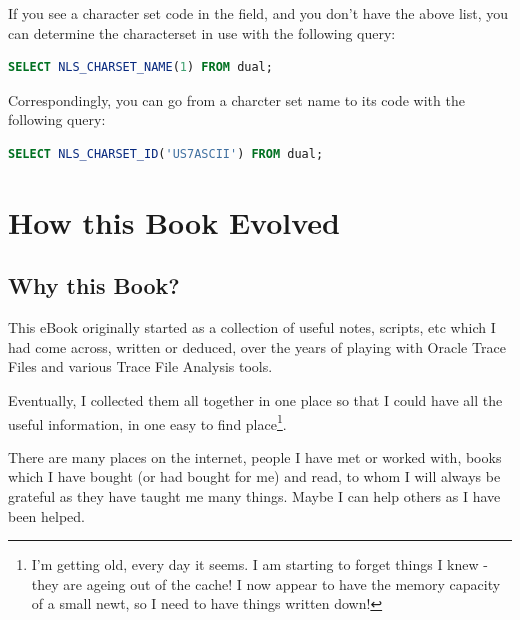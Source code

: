 \begin{appendix}
\begin{longtable}[]{@{}rl|rl|rl@{}}
\bottomrule
\end{longtable}

If you see a character set code in the  field, and you don't have the above list, you can determine the characterset in use with the following query:

\begin{lstlisting}[language=SQL,caption={SQL Query to Convert a \inline{csi} Code to a Charcter Set Name}]
SELECT NLS_CHARSET_NAME(1) FROM dual;
\end{lstlisting}

Correspondingly, you can go from a charcter set name to its  code with the following query:

\begin{lstlisting}[language=SQL,caption={SQL Query to Convert a Charcter Set Name  to a \inline{csi} Code}]
SELECT NLS_CHARSET_ID('US7ASCII') FROM dual;
\end{lstlisting}

\chapter{How this Book Evolved}
\label{how-this-book-evolved}%

\section{Why this Book?}\label{why-this-book}

This eBook originally started as a collection of useful notes, scripts, etc which I had come across, written or deduced, over the years of playing with Oracle Trace Files and various Trace File Analysis tools.

Eventually, I collected them all together in one place so that I could have all the useful information, in one easy to find place\footnote{I'm getting old, every day it seems. I am starting to forget things I knew - they are ageing out of the cache! I now appear to have the memory capacity of a small newt, so I need to have things written down!}.

There are many places on the internet, people I have met or worked with, books which I have bought (or had bought for me) and read, to whom I will always be grateful as they have taught me many things. Maybe I can help others as I have been helped.


\end{appendix}
